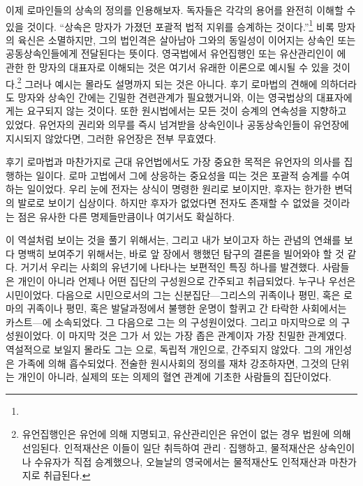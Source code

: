 이제 로마인들의 상속의 정의를 인용해보자.
독자들은 각각의 용어를 완전히 이해할 수 있을 것이다.
``상속은 망자가 가졌던 포괄적 법적 지위를 승계하는 것이다.''\footnote{%
   }
비록 망자의 육신은 소멸하지만,
그의 법인격은 살아남아 그와의 동일성이
이어지는 상속인 또는 공동상속인들에게
전달된다는 뜻이다.
영국법에서 유언집행인 또는
유산관리인이
에 관한 한 망자의 대표자로 이해되는 것은
여기서 유래한 이론으로 예시될 수 있을 것이다.\footnote{유언집행인은
  유언에 의해 지명되고, 유산관리인은 유언이 없는 경우 법원에 의해
  선임된다. 인적재산은 이들이 일단 취득하여 관리^^b7집행하고,
  물적재산은 상속인이나 수유자가 직접 승계했으나,
  오늘날의 영국에서는 물적재산도 인적재산과 마찬가지로 취급된다. }
그러나 예시는 몰라도 설명까지 되는 것은 아니다.
후기 로마법의 견해에 의하더라도
망자와 상속인 간에는 긴밀한 견련관계가 필요했거니와,
이는 영국법상의 대표자에게는 요구되지 않는 것이다.
또한 원시법에서는 모든 것이 승계의 연속성을 지향하고 있었다.
유언자의 권리와 의무를 즉시 넘겨받을 상속인이나 공동상속인들이
유언장에
지시되지 않았다면,
그러한 유언장은 전부 무효였다.

후기 로마법과 마찬가지로 근대 유언법에서도
가장 중요한 목적은 유언자의 의사를 집행하는 일이다.
로마 고법에서 그에 상응하는 중요성을 띠는 것은
포괄적 승계를 수여하는 일이었다.
우리 눈에 전자는 상식이 명령한 원리로 보이지만,
후자는 한가한 변덕의 발로로 보이기 십상이다.
하지만 후자가 없었다면 전자도 존재할 수 없었을 것이라는 점은
유사한 다른 명제들만큼이나 여기서도 확실하다.

이 역설처럼 보이는 것을 풀기 위해서는,
그리고 내가 보이고자 하는 관념의 연쇄를 보다 명백히 보여주기 위해서는,
바로 앞 장에서 행했던 탐구의 결론을 빌어와야 할 것 같다.
거기서 우리는 사회의 유년기에 나타나는 보편적인 특징 하나를 발견했다.
사람들은 개인이 아니라 언제나 어떤 집단의 구성원으로
간주되고 취급되었다.
누구나 우선은 시민이었다.
다음으로 시민으로서의 그는
신분집단---그리스의 귀족이나 평민,
혹은 로마의 귀족이나 평민,
혹은 발달과정에서 불행한 운명이 할퀴고 간 타락한 사회에서는
카스트---에 소속되었다.
그 다음으로 그는 의 구성원이었다.
그리고 마지막으로 의 구성원이었다.
이 마지막 것은 그가 서 있는 가장 좁은 관계이자 가장 친밀한 관계였다.
역설적으로 보일지 몰라도 그는 으로,
독립적 개인으로, 간주되지 않았다.
그의 개인성은 가족에 의해 흡수되었다.
전술한 원시사회의 정의를 재차 강조하자면,
그것의 단위는 개인이 아니라,
실제의 또는 의제의 혈연 관계에 기초한 사람들의 집단이었다.

